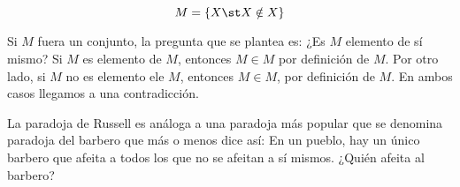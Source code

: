 \[ M = \{X \st X \notin X\} \]

Si $M$ fuera un conjunto, la pregunta que se plantea es: ¿Es $M$ elemento de
sí mismo? Si $M$ es elemento de $M$, entonces $M \in M$ por definición de
$M$. Por otro lado, si $M$ no es elemento ele $M$, entonces $M \in M$, por
definición de $M$. En ambos casos llegamos a una contradicción.

La paradoja de Russell es análoga a una paradoja más popular que se denomina
paradoja del barbero que más o menos dice así: En un pueblo, hay un único
barbero que afeita a todos los que no se afeitan a sí mismos. ¿Quién afeita
al barbero?




